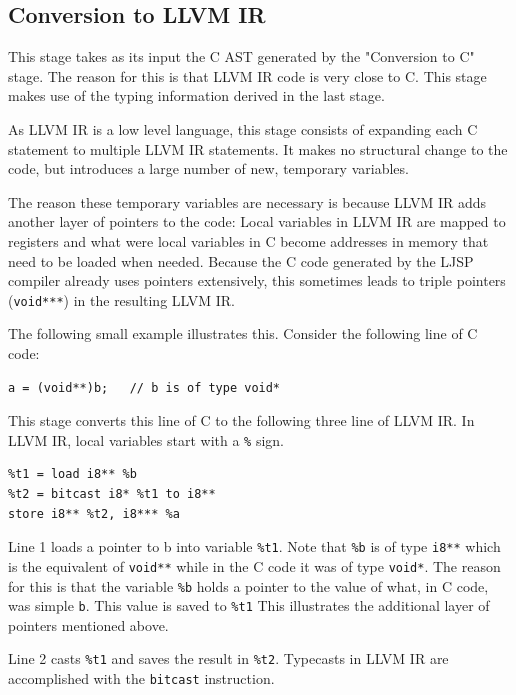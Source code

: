 \documentclass[11pt]{report}
\begin{document}
\subsection{Conversion to LLVM IR}
This stage takes as its input the C AST generated by the "Conversion to C" stage. The reason for this is that LLVM IR code is very close to C. This stage makes use of the typing information derived in the last stage.

As LLVM IR is a low level language, this stage consists of expanding each C statement to multiple LLVM IR statements. It makes no structural change to the code, but introduces a large number of new, temporary variables.

The reason these temporary variables are necessary is because LLVM IR adds another layer of pointers to the code: Local variables in LLVM IR are mapped to registers and what were local variables in C become addresses in memory that need to be loaded when needed. Because the C code generated by the LJSP compiler already uses pointers extensively, this sometimes leads to triple pointers (\texttt{void***}) in the resulting LLVM IR.

The following small example illustrates this. Consider the following line of C code:
\begin{lstlisting}
a = (void**)b;   // b is of type void*
\end{lstlisting}

This stage converts this line of C to the following three line of LLVM IR. In LLVM IR, local variables start with a \texttt{\%} sign. 

\begin{lstlisting}
%t1 = load i8** %b
%t2 = bitcast i8* %t1 to i8**
store i8** %t2, i8*** %a
\end{lstlisting}

Line 1 loads a pointer to b into variable \texttt{\%t1}. Note that \texttt{\%b} is of type \texttt{i8**} which is the equivalent of \texttt{void**} while in the C code it was of type \texttt{void*}. The reason for this is that the variable \texttt{\%b} holds a pointer to the value of what, in C code, was simple \texttt{b}. This value is saved to \texttt{\%t1} This illustrates the additional layer of pointers mentioned above.

Line 2 casts \texttt{\%t1} and saves the result in \texttt{\%t2}. Typecasts in LLVM IR are accomplished with the \texttt{bitcast} instruction.
\end{document}
